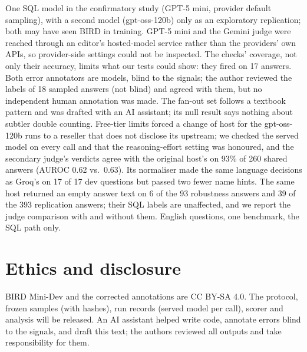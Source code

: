 \documentclass[10pt,twocolumn]{article}
\begin{document}
One SQL model in the confirmatory study (GPT-5 mini, provider default sampling), with a second model
(gpt-oss-120b) only as an exploratory replication; both may have seen BIRD in training. GPT-5 mini and
the Gemini judge were reached through an editor's hosted-model service rather than the providers' own
APIs, so provider-side settings could not be inspected. The checks' coverage, not only their accuracy,
limits what our tests could show: they fired on 17 answers. Both error annotators are models, blind to the signals; the author reviewed the labels of 18 sampled
answers (not blind) and agreed with them, but no independent human annotation was made. The fan-out set follows a textbook pattern and was drafted with an AI assistant; its null result
says nothing about subtler double counting. Free-tier limits forced a change of host for the
gpt-oss-120b runs to a reseller that does not disclose its upstream; we checked the served model on
every call and that the reasoning-effort setting was honoured, and the secondary judge's verdicts
agree with the original host's on 93\% of 260 shared answers (AUROC 0.62 vs.\ 0.63). Its normaliser made the same language decisions as Groq's on 17 of 17 dev questions but passed two
fewer name hints. The same host returned an empty answer text on 6 of the 93 robustness answers and 39 of the 393 replication answers; their SQL labels are unaffected, and
we report the judge comparison with and without them. English questions, one benchmark, the SQL path
only.

\section*{Ethics and disclosure}

BIRD Mini-Dev and the corrected annotations are CC BY-SA 4.0. The protocol, frozen samples (with
hashes), run records (served model per call), scorer and analysis will be released. An AI assistant
helped write code, annotate errors blind to the signals, and draft this text; the authors reviewed
all outputs and take responsibility for them.



\end{document}
